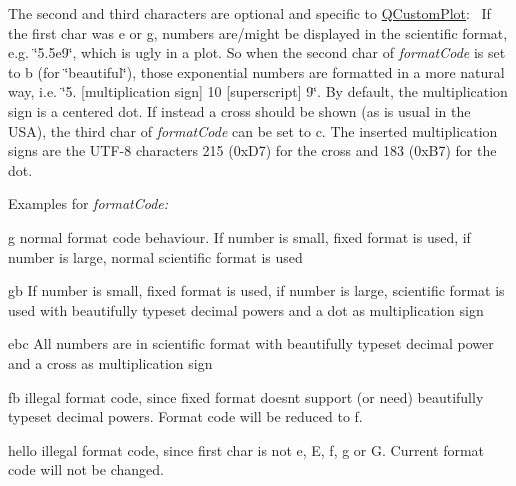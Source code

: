 The second and third characters are optional and specific to \hyperlink{class_q_custom_plot}{Q\+Custom\+Plot}\+:~\newline
If the first char was \textquotesingle{}e\textquotesingle{} or \textquotesingle{}g\textquotesingle{}, numbers are/might be displayed in the scientific format, e.\+g. \char`\"{}5.\+5e9\char`\"{}, which is ugly in a plot. So when the second char of {\itshape format\+Code} is set to \textquotesingle{}b\textquotesingle{} (for \char`\"{}beautiful\char`\"{}), those exponential numbers are formatted in a more natural way, i.\+e. \char`\"{}5.
\mbox{[}multiplication sign\mbox{]} 10 \mbox{[}superscript\mbox{]} 9\char`\"{}. By default, the multiplication sign is a centered dot. If instead a cross should be shown (as is usual in the U\+SA), the third char of {\itshape format\+Code} can be set to \textquotesingle{}c\textquotesingle{}. The inserted multiplication signs are the U\+T\+F-\/8 characters 215 (0x\+D7) for the cross and 183 (0x\+B7) for the dot.

Examples for {\itshape format\+Code\+:} \begin{DoxyItemize}
\item {\ttfamily g} normal format code behaviour. If number is small, fixed format is used, if number is large, normal scientific format is used \item {\ttfamily gb} If number is small, fixed format is used, if number is large, scientific format is used with beautifully typeset decimal powers and a dot as multiplication sign \item {\ttfamily ebc} All numbers are in scientific format with beautifully typeset decimal power and a cross as multiplication sign \item {\ttfamily fb} illegal format code, since fixed format doesn\textquotesingle{}t support (or need) beautifully typeset decimal powers. Format code will be reduced to \textquotesingle{}f\textquotesingle{}. \item {\ttfamily hello} illegal format code, since first char is not \textquotesingle{}e\textquotesingle{}, \textquotesingle{}E\textquotesingle{}, \textquotesingle{}f\textquotesingle{}, \textquotesingle{}g\textquotesingle{} or \textquotesingle{}G\textquotesingle{}. Current format code will not be changed. \end{DoxyItemize}
\mbox{\label{class_q_c_p_axis_a21dc8023ad7500382ad9574b48137e63}} 

